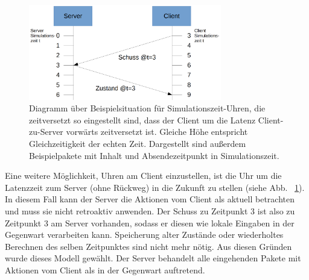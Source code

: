 \begin{figure}
    \centering
    \includegraphics[width=0.75\textwidth]{./Zeichnung2a.png}
    \caption{Diagramm über Beispielsituation für Simulationszeit-Uhren, die zeitversetzt so eingestellt sind, dass der Client um die Latenz Client-zu-Server vorwärts zeitversetzt ist. Gleiche Höhe entspricht Gleichzeitigkeit der echten Zeit. Dargestellt sind außerdem Beispielpakete mit Inhalt und Absendezeitpunkt in Simulationszeit.}
    \label{fig:zeichnung2a}
\end{figure}
Eine weitere Möglichkeit, Uhren am Client einzustellen, ist die Uhr um die Latenzzeit zum Server (ohne Rückweg) in die Zukunft zu stellen (siehe Abb. ~\ref{fig:zeichnung2a}). In diesem Fall kann der Server die Aktionen vom Client als aktuell betrachten und muss sie nicht retroaktiv anwenden. Der Schuss zu Zeitpunkt 3 ist also zu Zeitpunkt 3 am Server vorhanden, sodass er diesen wie lokale Eingaben in der Gegenwart verarbeiten kann. Speicherung alter Zustände oder wiederholtes Berechnen des selben Zeitpunktes sind nicht mehr nötig. Aus diesen Gründen wurde dieses Modell gewählt. Der Server behandelt alle eingehenden Pakete mit Aktionen vom Client als in der Gegenwart auftretend.

